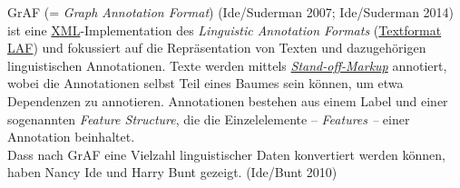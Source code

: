 \documentclass{article}
\begin{document}
    GrAF (= \emph{Graph Annotation Format}) (Ide/Suderman 2007;
                     Ide/Suderman 2014) ist eine \href{http://gams.uni-graz.at/o:konde.215}{XML}-Implementation des \emph{Linguistic Annotation
                     Formats} (\href{http://gams.uni-graz.at/o:konde.187}{Textformat LAF})
                  und fokussiert auf die Repräsentation von Texten und dazugehörigen linguistischen
                  Annotationen. Texte werden mittels \emph{\href{http://gams.uni-graz.at/o:konde.178}{Stand-off-Markup}} annotiert, wobei die Annotationen selbst Teil eines Baumes sein können, um
                  etwa Dependenzen zu annotieren. Annotationen bestehen aus einem Label und einer
                  sogenannten \emph{Feature Structure}, die die Einzelelemente – \emph{Features –} einer Annotation beinhaltet.\\
            
        Dass nach GrAF eine Vielzahl linguistischer Daten konvertiert werden können, haben
                  Nancy Ide und Harry Bunt gezeigt. (Ide/Bunt 2010)\\
            
\end{document}
